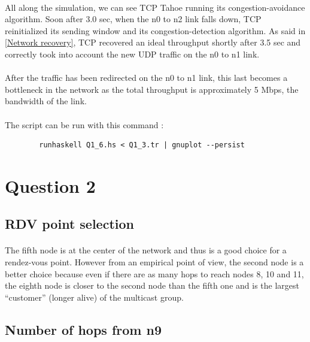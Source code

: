 \documentclass[a4paper]{article}
\begin{document}
    \paragraph{}All along the simulation, we can see TCP Tahoe running its
congestion-avoidance algorithm. \newline
Soon after 3.0 sec, when the n0 to n2 link falls down, TCP reinitialized its
sending window and its congestion-detection algorithm. As said in
\ref{Network recovery}, TCP recovered an ideal throughput shortly after 3.5 sec
and correctly took into account the new UDP traffic on the n0 to n1 link.

    \paragraph{}After the traffic has been redirected on the n0 to n1
link, this last becomes a bottleneck in the network as the total throughput is
approximately 5 Mbps, the bandwidth of the link.

    \paragraph{}The script can be run with this command :
    \begin{verbatim}
        runhaskell Q1_6.hs < Q1_3.tr | gnuplot --persist
    \end{verbatim}

  \section{Question 2}

    \subsection{RDV point selection}

    \paragraph{}The fifth node is at the center of the network and thus is a
good choice for a rendez-vous point.
However from an empirical point of view, the second node is a better choice
because even if there are as many hops to reach nodes 8, 10 and 11, the eighth
node is closer to the second node than the fifth one and is the largest
\enquote{customer} (longer alive) of the multicast group.

  \subsection{Number of hops from n9}
\end{document}
